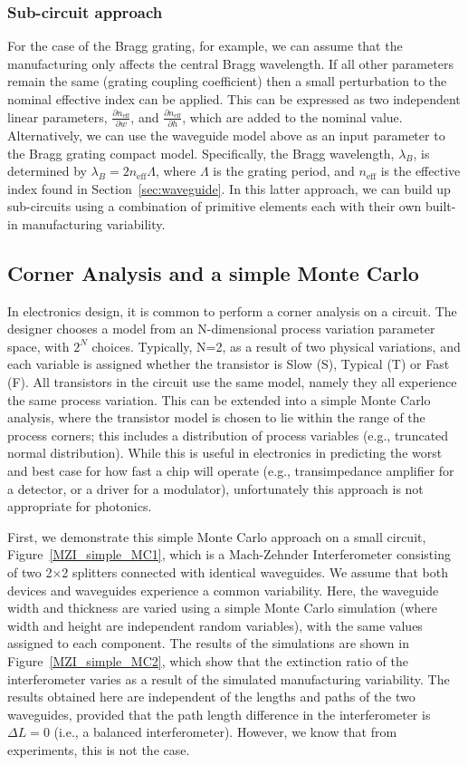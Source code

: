 \documentclass[journal]{spie}
\begin{document}
\subsubsection{Sub-circuit approach}
For the case of the Bragg grating, for example, we can assume that the manufacturing only affects the central Bragg wavelength.  If all other parameters remain the same (grating coupling coefficient) then a small perturbation to the nominal effective index can be applied.  This can be expressed as two independent linear parameters, $ \frac{\partial n_\text{eff}}{\partial w}$, and $ \frac{\partial n_\text{eff}}{\partial h}$, which are added to the nominal value.  Alternatively, we can use the waveguide model above as an input parameter to the Bragg grating compact model.  Specifically, the Bragg wavelength, $\lambda_B$, is determined by $\lambda_B = 2 n_\text{eff} \Lambda$, where $\Lambda$ is the grating period, and $n_\text{eff}$ is the effective index found in Section~\ref{sec:waveguide}.  In this latter approach, we can build up sub-circuits using a combination of primitive elements each with their own built-in manufacturing variability.

\subsection{Corner Analysis and a simple Monte Carlo}
\label{sec:corner}
In electronics design, it is common to perform a corner analysis on a circuit.  The designer chooses a model from an N-dimensional process variation parameter space, with $2^N$ choices.  Typically, N=2, as a result of two physical variations, and each variable is assigned whether the transistor is Slow (S), Typical (T) or Fast (F).  All transistors in the circuit use the same model, namely they all experience the same process variation.  This can be extended into a simple Monte Carlo analysis, where the transistor model is chosen to lie within the range of the process corners; this includes a distribution of process variables (e.g., truncated normal distribution). While this is useful in electronics in predicting the worst and best case for how fast a chip will operate (e.g., transimpedance amplifier for a detector, or a driver for a modulator), unfortunately this approach is not appropriate for photonics.  

First, we demonstrate this simple Monte Carlo approach on a small circuit, Figure~\ref{MZI_simple_MC1}, which is a Mach-Zehnder Interferometer consisting of two 2$\times$2 splitters connected with identical waveguides.  We assume that both devices and waveguides experience a common variability.  Here, the waveguide width and thickness are varied using a simple Monte Carlo simulation (where width and height are independent random variables), with the same values assigned to each component.  The results of the simulations are shown in  Figure~\ref{MZI_simple_MC2}, which show that the extinction ratio of the interferometer varies as a result of the simulated manufacturing variability.  The results obtained here are independent of the lengths and paths of the two waveguides, provided that the path length difference in the interferometer is $\Delta L = 0$ (i.e., a balanced interferometer). However, we know that from experiments, this is not the case.  
\end{document}
